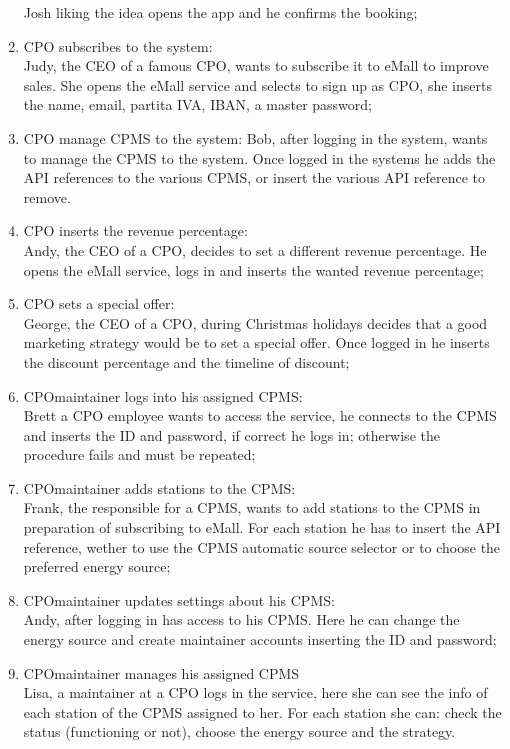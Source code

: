 \begin{enumerate}[label=\textbf{S\arabic*}]
          Josh liking the idea opens the app and he confirms the booking;\label{SCE:user-gets-suggestions}
    \item \ac{CPO} subscribes to the system:\\
          Judy, the CEO of a famous \ac{CPO}, wants to subscribe it to \ac{eMall} to improve sales.
          She opens the \ac{eMall} service and selects to sign up as \ac{CPO}, she inserts the name, email, \gls{partita IVA}, \ac{IBAN}, a master password;\label{SCE:cpo-signs-up}
    \item \ac{CPO} manage \ac{CPMS} to the system:
          Bob, after logging in the system, wants to manage the \ac{CPMS} to the system. Once logged in the systems he adds the \ac{API} references to the various \ac{CPMS}, or insert the various \ac{API} reference to remove.
    \item \ac{CPO} inserts the revenue percentage:\\
          Andy, the CEO of a \ac{CPO}, decides to set a different revenue percentage. He opens the \ac{eMall} service, logs in and inserts the wanted revenue percentage;\label{SCE:cpo-sets-revenue-percentage}
    \item \ac{CPO} sets a special offer:\\
          George, the CEO of a \ac{CPO}, during Christmas holidays decides that a good marketing strategy would be to set a special offer. Once logged in he inserts the discount percentage and the timeline of discount; \label{SCE:cpo-sets-special-offer}
    \item \ac{CPO}maintainer logs into his assigned \ac{CPMS}:\\
          Brett a \ac{CPO} employee wants to access the service, he connects to the \ac{CPMS} and inserts the ID
          and password, if correct he logs in; otherwise the procedure fails and must be repeated;\label{SCE:cpomaintainer-logs-in}
    \item \ac{CPO}maintainer adds stations to the \ac{CPMS}:\\
          Frank, the responsible for a \ac{CPMS}, wants to add stations to the \ac{CPMS} in preparation of subscribing to \ac{eMall}. For each station he has to insert the \ac{API} reference,
          wether to use the \ac{CPMS} automatic source selector or to choose the preferred energy source;\label{SCE:cpomaintainer-adds-stations}
    \item \ac{CPO}maintainer updates settings about his \ac{CPMS}:\\
          Andy, after logging in has access to his \ac{CPMS}.
          Here he can change the energy source and create maintainer accounts inserting the ID and password;\label{SCE:cpomaintainer-updates-settings}
    \item \ac{CPO}maintainer manages his assigned \ac{CPMS}\\
          Lisa, a maintainer at a \ac{CPO} logs in the service, here she can see the info of each station of the \ac{CPMS} assigned to her.
          For each station she can: check the status (functioning or not), choose the energy source and the strategy.\label{SCE:cpomaintainer-manages}
\end{enumerate}

